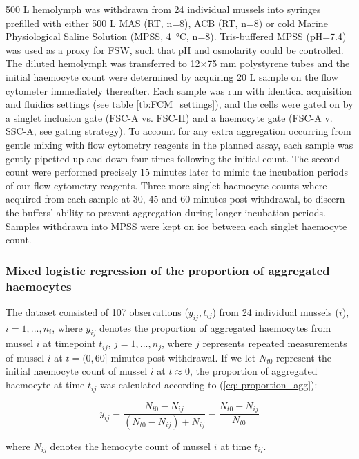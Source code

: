 500 \micro L hemolymph was withdrawn from 24 individual mussels into syringes prefilled with either 500 \micro L MAS (RT, n=8), ACB (RT, n=8) or cold Marine Physiological Saline Solution (MPSS, \SI{4}{\celsius}, n=8). Tris-buffered MPSS (pH=7.4) was used as a proxy for FSW, such that pH and osmolarity could be controlled. The diluted hemolymph was transferred to 12$\times$75 mm polystyrene tubes and the initial haemocyte count were determined by acquiring 20 \micro L sample on the flow cytometer immediately thereafter. Each sample was run with identical acquisition and fluidics settings (see table \ref{tb:FCM_settings}), and the cells were gated on by a singlet inclusion gate (FSC-A vs. FSC-H) and a haemocyte gate (FSC-A v. SSC-A, see gating strategy). To account for any extra aggregation occurring from gentle mixing with flow cytometry reagents in the planned assay, each sample was gently pipetted up and down four times following the initial count. The second count were performed precisely 15 minutes later to mimic the incubation periods of our flow cytometry reagents. Three more singlet haemocyte counts where acquired from each sample at 30, 45 and 60 minutes post-withdrawal, to discern the buffers' ability to prevent aggregation during longer incubation periods. Samples withdrawn into MPSS were kept on ice between each singlet haemocyte count.

\subsubsection{Mixed logistic regression of the proportion of aggregated haemocytes}
The dataset consisted of 107 observations ($y_{ij}, t_{ij}$) from 24 individual mussels ($i$), $i = 1,...,n_{i}$, where $y_{ij}$ denotes the proportion of aggregated haemocytes from mussel $i$ at timepoint $t_{ij}$, $j = 1,...,n_{j}$, where $j$ represents repeated measurements of mussel $i$ at $t = (0, 60]$ minutes post-withdrawal. If we let $N_{t0}$ represent the initial haemocyte count of mussel $i$ at $t \approx 0$, the proportion of aggregated haemocyte at time $t_{ij}$ was calculated according to (\ref{eq: proportion_agg}):

\begin{equation}
    \label{eq: proportion_agg}
    y_{ij} = \dfrac{N_{t0} - N_{ij}}{(N_{t0} - N_{ij}) + N_{ij}} = \dfrac{N_{t0} - N_{ij}}{N_{t0}}
\end{equation}

\noindent where $N_{ij}$ denotes the hemocyte count of mussel $i$ at time $t_{ij}$.

